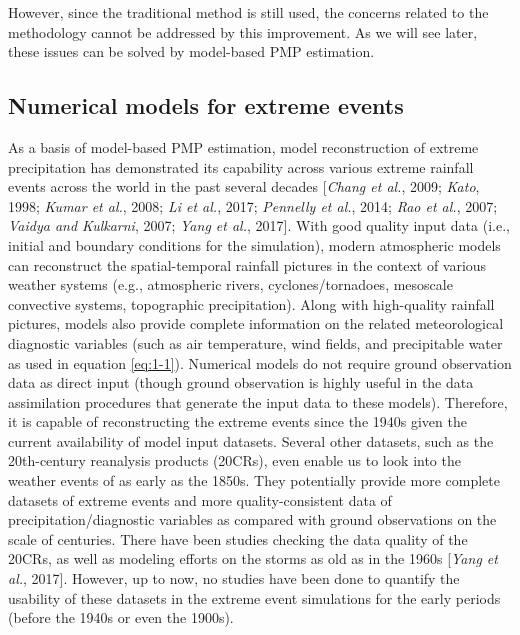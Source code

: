 However, since the traditional method is still used, the concerns related to the methodology cannot be addressed by this improvement. As we will see later, these issues can be solved by model-based PMP estimation.

\subsection{Numerical models for extreme events}

As a basis of model-based PMP estimation, model reconstruction of extreme precipitation has demonstrated its capability across various extreme rainfall events across the world in the past several decades [\textit{Chang et al.}, 2009; \textit{Kato}, 1998; \textit{Kumar et al.}, 2008; \textit{Li et al.}, 2017; \textit{Pennelly et al.}, 2014; \textit{Rao et al.}, 2007; \textit{Vaidya and Kulkarni}, 2007; \textit{Yang et al.}, 2017]. With good quality input data (i.e., initial and boundary conditions for the simulation), modern atmospheric models can reconstruct the spatial-temporal rainfall pictures in the context of various weather systems (e.g., atmospheric rivers, cyclones/tornadoes, mesoscale convective systems, topographic precipitation). Along with high-quality rainfall pictures, models also provide complete information on the related meteorological diagnostic variables (such as air temperature, wind fields, and precipitable water as used in equation \ref{eq:1-1}). Numerical models do not require ground observation data as direct input (though ground observation is highly useful in the data assimilation procedures that generate the input data to these models). Therefore, it is capable of reconstructing the extreme events since the 1940s given the current availability of model input datasets. Several other datasets, such as the 20th-century reanalysis products (20CRs), even enable us to look into the weather events of as early as the 1850s. They potentially provide more complete datasets of extreme events and more quality-consistent data of precipitation/diagnostic variables as compared with ground observations on the scale of centuries. There have been studies checking the data quality of the 20CRs, as well as modeling efforts on the storms as old as in the 1960s [\textit{Yang et al.}, 2017]. However, up to now, no studies have been done to quantify the usability of these datasets in the extreme event simulations for the early periods (before the 1940s or even the 1900s).

